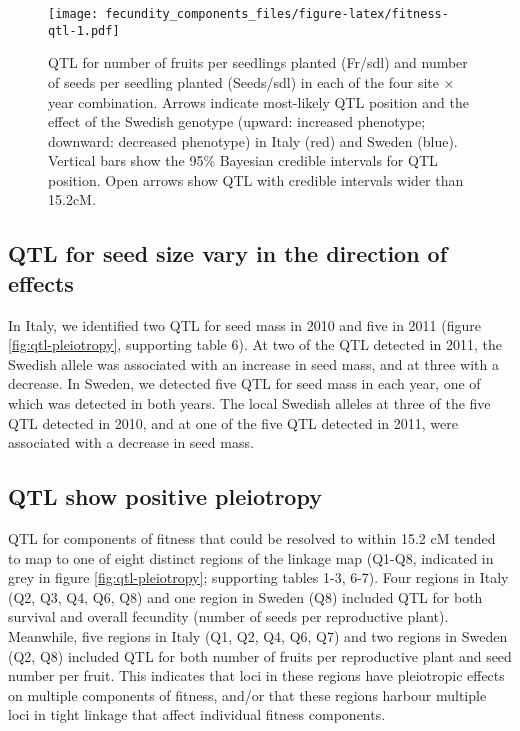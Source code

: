 \documentclass[12pt,]{article}
\begin{document}
\begin{figure}
\centering
\texttt{[image: fecundity\_components\_files/figure-latex/fitness-qtl-1.pdf]}
\caption{\label{fig:fitness-qtl}QTL for number of fruits per seedlings planted (Fr/sdl) and number of seeds per seedling planted (Seeds/sdl) in each of the four site × year combination. Arrows indicate most-likely QTL position and the effect of the Swedish genotype (upward: increased phenotype; downward: decreased phenotype) in Italy (red) and Sweden (blue). Vertical bars show the 95\% Bayesian credible intervals for QTL position. Open arrows show QTL with credible intervals wider than 15.2cM.}
\end{figure}

\hypertarget{qtl-for-seed-size-vary-in-the-direction-of-effects}{%
\subsection{QTL for seed size vary in the direction of effects}\label{qtl-for-seed-size-vary-in-the-direction-of-effects}}

In Italy, we identified two QTL for seed mass in 2010 and five in 2011 (figure \ref{fig:qtl-pleiotropy}, supporting table 6).
At two of the QTL detected in 2011, the Swedish allele was associated with an increase in seed mass, and at three with a decrease. In Sweden, we detected five QTL for seed mass in each year, one of which was detected in both years. The local Swedish alleles at three of the five QTL detected in 2010, and at one of the five QTL detected in 2011, were associated with a decrease in seed mass.

\hypertarget{qtl-show-positive-pleiotropy}{%
\subsection{QTL show positive pleiotropy}\label{qtl-show-positive-pleiotropy}}

QTL for components of fitness that could be resolved to within 15.2 cM tended to map to one of eight distinct regions of the linkage map (Q1-Q8, indicated in grey in figure \ref{fig:qtl-pleiotropy}; supporting tables 1-3, 6-7).
Four regions in Italy (Q2, Q3, Q4, Q6, Q8) and one region in Sweden (Q8) included QTL for both survival and overall fecundity (number of seeds per reproductive plant).
Meanwhile, five regions in Italy (Q1, Q2, Q4, Q6, Q7) and two regions in Sweden (Q2, Q8) included QTL for both number of fruits per reproductive plant and seed number per fruit.
This indicates that loci in these regions have pleiotropic effects on multiple components of fitness, and/or that these regions harbour multiple loci in tight linkage that affect individual fitness components.
\end{document}
